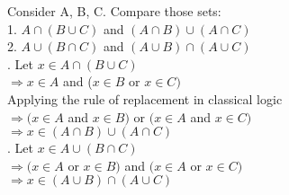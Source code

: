 \documentclass{article}
\begin{document}
\noindent Consider A, B, C. Compare those sets:\\
1. $A \cap (B \cup C) $ and $(A \cap B) \cup (A \cap C)$\\
2. $A \cup (B \cap C) $ and $(A \cup B) \cap (A \cup C)$\\

. Let $x \in A \cap (B \cup C) $\\
$\Rightarrow x \in A$ and ($ x \in B$ or $x \in C)$\\
Applying the rule of replacement in classical logic\\
$\Rightarrow (x \in A$ and $x \in B)$ or $(x \in A$ and $x \in C)$\\
$\Rightarrow x \in (A \cap B) \cup (A \cap C)$\\

. Let $x \in A \cup (B \cap C)$\\
$\Rightarrow (x \in A$  or $x \in B)$ and $ (x \in A$ or $x \in C)$\\
$\Rightarrow x \in (A \cup B) \cap (A \cup C)$\\
\end{document}
